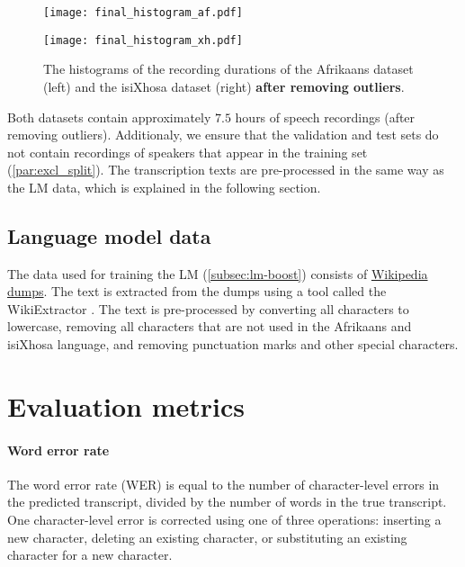 \begin{figure}[!ht]
    \centering
    \begin{minipage}{.45\textwidth}
      \centering
      \texttt{[image: final\_histogram\_af.pdf]}
    \end{minipage}%
    \begin{minipage}{.45\textwidth}
      \centering
      \texttt{[image: final\_histogram\_xh.pdf]}
    \end{minipage}
    \caption{The histograms of the recording durations of the Afrikaans dataset (left) and the isiXhosa dataset (right) \textbf{after removing outliers}.}
    \label{fig:histogram2}
\end{figure}

Both datasets contain approximately $7.5$ hours of speech recordings (after removing outliers). 
Additionaly, we ensure that the validation and test sets do not contain recordings of speakers that appear in the training set (\ref{par:excl_split}).
The transcription texts are pre-processed in the same way as the LM data, which is explained in the following section.

\subsection{Language model data}
The data used for training the LM (\ref{subsec:lm-boost}) consists of \href{https://dumps.wikimedia.org/}{Wikipedia dumps}.
The text is extracted from the dumps using a tool called the WikiExtractor \cite{Wikiextractor2015}.
The text is pre-processed by converting all characters to lowercase, removing all characters that are not used in the Afrikaans
and isiXhosa language, and removing punctuation marks and other special characters.

\section{Evaluation metrics}

\paragraph*{Word error rate} \label{subsec:wer}
The word error rate (WER) \cite{WordErrorRate} is equal to the number of character-level errors in the predicted transcript, 
divided by the number of words in the true transcript. One character-level error is corrected using one of three operations:
inserting a new character, deleting an existing character, or substituting an existing character for a new character.
